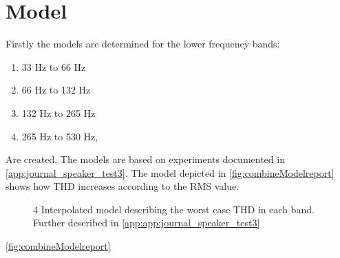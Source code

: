 \section{Model}

Firstly the models are determined for the lower frequency bands:
\begin{enumerate}
\item 33 Hz to 66 Hz
\item 66 Hz to 132 Hz
\item 132 Hz to 265 Hz
\item 265 Hz to 530 Hz,
\end{enumerate}
Are created. The models are based on experiments documented in \autoref{app:journal_speaker_test3}. The model depicted in \autoref{fig:combineModelreport} shows how THD increases according to the RMS value. 


\begin{figure}[H]
    \centering
    
    \caption{4 Interpolated model describing the worst case THD in each band. Further described in \autoref{app:app:journal_speaker_test3}}
    \label{fig:CombinedModelreport}
\end{figure}

\autoref{fig:combineModelreport}